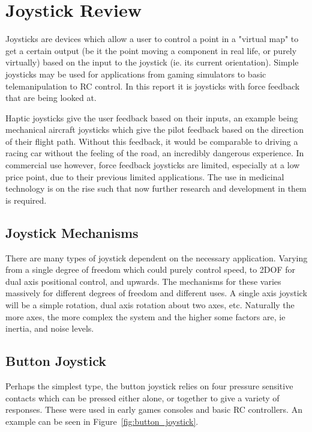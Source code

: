 \section{Joystick Review} %
\label{sec:joystick_review}

Joysticks are devices which allow a user to control a point in a "virtual map" to get a certain output (be it the point moving a component in real life, or purely virtually) based on the input to the joystick (ie. its current orientation). Simple joysticks may be used for applications from gaming simulators to basic telemanipulation to RC control. In this report it is joysticks with force feedback that are being looked at.

Haptic joysticks give the user feedback based on their inputs, an example being mechanical aircraft joysticks which give the pilot feedback based on the direction of their flight path. Without this feedback, it would be comparable to driving a racing car without the feeling of the road, an incredibly dangerous experience. In commercial use however, force feedback joysticks are limited, especially at a low price point, due to their previous limited applications. The use in medicinal technology is on the rise such that now further research and development in them is required.


\subsection{Joystick Mechanisms} %
\label{sub:joystick_mechanisms}

There are many types of joystick dependent on the necessary application. Varying from a single degree of freedom which could purely control speed, to 2DOF for dual axis positional control, and upwards. The mechanisms for these varies massively for different degrees of freedom and different uses. A single axis joystick will be a simple rotation, dual axis rotation about two axes, etc. Naturally the more axes, the more complex the system and the higher some factors are, ie inertia, and noise levels.


\subsection{Button Joystick} %
\label{sub:button_joystick}

Perhaps the simplest type, the button joystick relies on four pressure sensitive contacts which can be pressed either alone, or together to give a variety of responses. These were used in early games consoles and basic RC controllers. An example can be seen in Figure~\ref{fig:button_joystick}.


